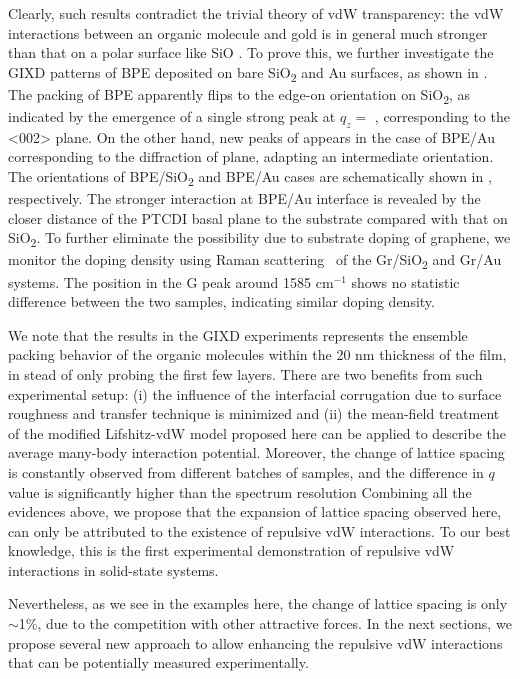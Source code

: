 Clearly, such results contradict the trivial theory of vdW
transparency: the vdW interactions between an organic molecule and
gold is in general much stronger than that on a polar surface like
SiO .
%
To prove this, we further investigate the GIXD patterns of BPE
deposited on bare SiO\textsubscript{2} and Au surfaces, as shown in
.
%
The packing of BPE apparently flips to the edge-on orientation on
SiO\textsubscript{2}, as indicated by the emergence of a single strong
peak at $q_{z}=$ , corresponding to the <002>
plane.
%
On the other hand, new peaks of  appears in the case
of BPE/Au corresponding to the diffraction of  plane,
adapting an intermediate orientation.
%
The orientations of BPE/SiO\textsubscript{2} and BPE/Au cases are schematically shown in , respectively.
%
The stronger interaction at BPE/Au interface is revealed by the closer
distance of the PTCDI basal plane to the substrate compared with that
on SiO\textsubscript{2}.
%
To further eliminate the possibility due to substrate doping of
graphene, we monitor the doping density using Raman scattering~\cite{Das_2008_doping} of the
Gr/SiO\textsubscript{2} and Gr/Au systems.
%
The position in the G peak around 1585 cm$^{-1}$ shows no statistic
difference between the two samples, indicating similar doping density.

We note that the results in the GIXD experiments represents the
ensemble packing behavior of the organic molecules within the 20 nm
thickness of the film, in stead of only probing the first few layers.
%
There are two benefits from such experimental setup: (i) the influence
of the interfacial corrugation due to surface roughness and transfer
technique is minimized and (ii) the mean-field treatment of the
modified Lifshitz-vdW model proposed here can be applied to describe
the average many-body interaction potential.
%
Moreover, the change of lattice spacing is constantly observed from
different batches of samples, and the difference in $q$ value is
significantly higher than the spectrum resolution 
%
 Combining all the evidences
%
above, we propose that the expansion of lattice spacing observed here,
can only be attributed to the existence of repulsive vdW interactions.
%
To our best knowledge, this is the first experimental demonstration of
repulsive vdW interactions in solid-state systems.

Nevertheless, as we see in the examples here, the change of lattice spacing is only $\sim{}$1\%, due to the competition with other attractive forces.
%
In the next sections, we propose several new approach to allow enhancing the repulsive vdW interactions that can be potentially measured experimentally.

